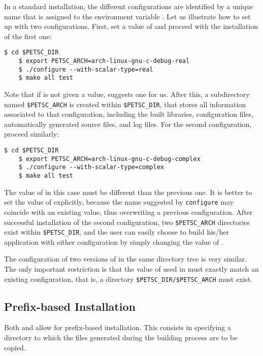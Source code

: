In a standard installation, the different configurations are identified by a unique name that is assigned to the environment variable . Let us illustrate how to set up \petsc with two configurations. First, set a value of  and proceed with the installation of the first one:
	\begin{Verbatim}[fontsize=\small]
	$ cd $PETSC_DIR
	$ export PETSC_ARCH=arch-linux-gnu-c-debug-real
	$ ./configure --with-scalar-type=real
	$ make all test
	\end{Verbatim}
Note that if  is not given a value, \petsc suggests one for us. After this, a subdirectory named \texttt{\$PETSC\_ARCH} is created within \texttt{\$PETSC\_DIR}, that stores all information associated to that configuration, including the built libraries, configuration files, automatically generated source files, and log files. For the second configuration, proceed similarly:
	\begin{Verbatim}[fontsize=\small]
	$ cd $PETSC_DIR
	$ export PETSC_ARCH=arch-linux-gnu-c-debug-complex
	$ ./configure --with-scalar-type=complex
	$ make all test
	\end{Verbatim}
The value of  in this case must be different than the previous one. It is better to set the value of  explicitly, because the name suggested by \texttt{configure} may coincide with an existing value, thus overwriting a previous configuration. After successful installation of the second configuration, two \texttt{\$PETSC\_ARCH} directories exist within \texttt{\$PETSC\_DIR}, and the user can easily choose to build his/her application with either configuration by simply changing the value of .

The configuration of two versions of \slepc in the same directory tree is very similar. The only important restriction is that the value of  used in \slepc must exactly match an existing \petsc configuration, that is, a directory \texttt{\$PETSC\_DIR/\$PETSC\_ARCH} must exist.

\subsection{Prefix-based Installation}
\label{sec:prefix-inst}

Both \petsc and \slepc allow for prefix-based installation. This consists in specifying a directory to which the files generated during the building process are to be copied.

